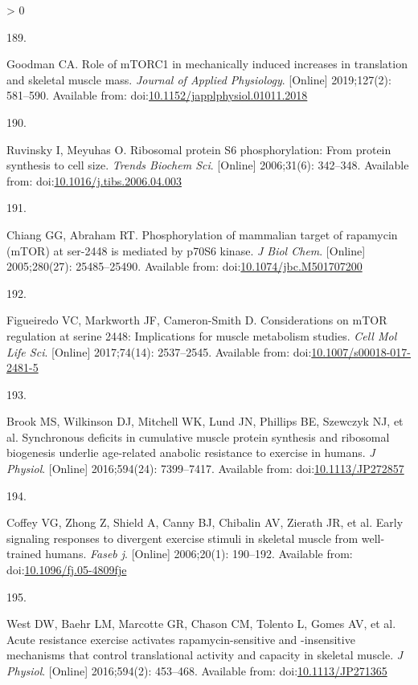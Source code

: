 \documentclass[twoside,10pt]{gihclass} %
\newlength{\cslhangindent}
\newlength{\csllabelwidth}
\newenvironment{CSLReferences}[3] %
 {%
  \setlength{\parindent}{0pt}
  \ifodd #1 \everypar{\setlength{\hangindent}{\cslhangindent}}\ignorespaces\fi
  \ifnum #2 > 0
  \setlength{\parskip}{#2\baselineskip}
  \fi
 }%
 {}
\newcommand{\CSLLeftMargin}[1]{\parbox[t]{\maxof{\widthof{#1}}{\csllabelwidth}}{#1}}
\newcommand{\CSLRightInline}[1]{\parbox[t]{\linewidth}{#1}}
\begin{document}
\begin{CSLReferences}{0}{0}
\leavevmode\hypertarget{ref-RN2320}{}%
\CSLLeftMargin{189. }
\CSLRightInline{Goodman CA. Role of mTORC1 in mechanically induced increases in translation and skeletal muscle mass. \emph{Journal of Applied Physiology}. {[}Online{]} 2019;127(2): 581--590. Available from: doi:\href{https://doi.org/10.1152/japplphysiol.01011.2018}{10.1152/japplphysiol.01011.2018}}

\leavevmode\hypertarget{ref-RN2824}{}%
\CSLLeftMargin{190. }
\CSLRightInline{Ruvinsky I, Meyuhas O. Ribosomal protein S6 phosphorylation: From protein synthesis to cell size. \emph{Trends Biochem Sci}. {[}Online{]} 2006;31(6): 342--348. Available from: doi:\href{https://doi.org/10.1016/j.tibs.2006.04.003}{10.1016/j.tibs.2006.04.003}}

\leavevmode\hypertarget{ref-RN1902}{}%
\CSLLeftMargin{191. }
\CSLRightInline{Chiang GG, Abraham RT. Phosphorylation of mammalian target of rapamycin (mTOR) at ser-2448 is mediated by p70S6 kinase. \emph{J Biol Chem}. {[}Online{]} 2005;280(27): 25485--25490. Available from: doi:\href{https://doi.org/10.1074/jbc.M501707200}{10.1074/jbc.M501707200}}

\leavevmode\hypertarget{ref-RN1949}{}%
\CSLLeftMargin{192. }
\CSLRightInline{Figueiredo VC, Markworth JF, Cameron-Smith D. Considerations on mTOR regulation at serine 2448: Implications for muscle metabolism studies. \emph{Cell Mol Life Sci}. {[}Online{]} 2017;74(14): 2537--2545. Available from: doi:\href{https://doi.org/10.1007/s00018-017-2481-5}{10.1007/s00018-017-2481-5}}

\leavevmode\hypertarget{ref-RN1809}{}%
\CSLLeftMargin{193. }
\CSLRightInline{Brook MS, Wilkinson DJ, Mitchell WK, Lund JN, Phillips BE, Szewczyk NJ, et al. Synchronous deficits in cumulative muscle protein synthesis and ribosomal biogenesis underlie age-related anabolic resistance to exercise in humans. \emph{J Physiol}. {[}Online{]} 2016;594(24): 7399--7417. Available from: doi:\href{https://doi.org/10.1113/JP272857}{10.1113/JP272857}}

\leavevmode\hypertarget{ref-RN1871}{}%
\CSLLeftMargin{194. }
\CSLRightInline{Coffey VG, Zhong Z, Shield A, Canny BJ, Chibalin AV, Zierath JR, et al. Early signaling responses to divergent exercise stimuli in skeletal muscle from well-trained humans. \emph{Faseb j}. {[}Online{]} 2006;20(1): 190--192. Available from: doi:\href{https://doi.org/10.1096/fj.05-4809fje}{10.1096/fj.05-4809fje}}

\leavevmode\hypertarget{ref-RN1754}{}%
\CSLLeftMargin{195. }
\CSLRightInline{West DW, Baehr LM, Marcotte GR, Chason CM, Tolento L, Gomes AV, et al. Acute resistance exercise activates rapamycin-sensitive and -insensitive mechanisms that control translational activity and capacity in skeletal muscle. \emph{J Physiol}. {[}Online{]} 2016;594(2): 453--468. Available from: doi:\href{https://doi.org/10.1113/JP271365}{10.1113/JP271365}}


\end{CSLReferences}
\end{document}
